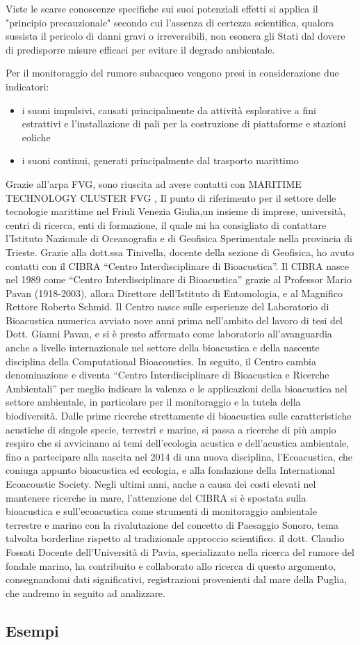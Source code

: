 Viste le scarse conoscenze specifiche sui suoi potenziali effetti si applica il "principio precauzionale" secondo cui l’assenza di certezza scientifica, qualora sussista il pericolo di danni gravi o irreversibili, non esonera gli Stati dal dovere di predisporre misure efficaci per evitare il degrado ambientale.

Per il monitoraggio del rumore subacqueo vengono presi in considerazione due indicatori:
\begin{itemize}
\item i suoni impulsivi, causati principalmente da attività esplorative a fini estrattivi e l’installazione di pali per la costruzione di piattaforme e stazioni eoliche
\item i suoni continui, generati principalmente dal trasporto marittimo
\end{itemize}

Grazie all'arpa FVG, sono riuscita ad avere contatti con MARITIME TECHNOLOGY CLUSTER FVG , Il punto di riferimento per il settore delle tecnologie marittime nel Friuli Venezia Giulia,un insieme di imprese, università, centri di ricerca, enti di formazione, il quale mi ha consigliato di contattare l'Istituto Nazionale di Oceanografia e di Geofisica Sperimentale nella provincia di Trieste. 
Grazie alla dott.ssa Tinivella, docente della sezione di Geofisica, ho avuto contatti con il CIBRA “Centro Interdisciplinare di Bioacustica”. 
Il CIBRA nasce nel 1989 come “Centro Interdisciplinare di Bioacustica” grazie al Professor Mario Pavan (1918-2003), allora Direttore dell'Istituto di Entomologia, e al Magnifico Rettore Roberto Schmid. Il Centro nasce sulle esperienze del Laboratorio di Bioacustica numerica avviato nove anni prima nell’ambito del lavoro di tesi del Dott. Gianni Pavan, e si è presto affermato come laboratorio all'avanguardia anche a livello internazionale nel settore della bioacustica e della nascente disciplina della Computational Bioacoustics. In seguito, il Centro cambia denominazione e diventa “Centro Interdisciplinare di Bioacustica e Ricerche Ambientali” per meglio indicare la valenza e le applicazioni della bioacustica nel settore ambientale, in particolare per il monitoraggio e la tutela della biodiversità.
Dalle prime ricerche strettamente di bioacustica sulle caratteristiche acustiche di singole specie, terrestri e marine, si passa a ricerche di più ampio respiro che si avvicinano ai temi dell'ecologia acustica e dell'acustica ambientale, fino a partecipare alla nascita nel 2014 di una nuova disciplina, l’Ecoacustica, che coniuga appunto bioacustica ed ecologia, e alla fondazione della International Ecoacoustic Society.
Negli ultimi anni, anche a causa dei costi elevati nel mantenere ricerche in mare, l'attenzione del CIBRA si è spostata sulla bioacustica e sull’ecoacustica come strumenti di monitoraggio ambientale terrestre e marino con la rivalutazione del concetto di Paesaggio Sonoro, tema talvolta borderline rispetto al tradizionale approccio scientifico.
il dott. Claudio Fossati Docente dell'Università di Pavia, specializzato nella ricerca del rumore del fondale marino, ha contribuito e collaborato allo ricerca di questo argomento, consegnandomi dati significativi, registrazioni provenienti dal mare della Puglia, che andremo in seguito ad analizzare. 

\subsection{Esempi}


